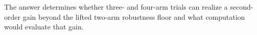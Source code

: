 The answer determines whether three- and four-arm trials can realize a second-order gain beyond the lifted two-arm robustness floor and what computation would evaluate that gain.